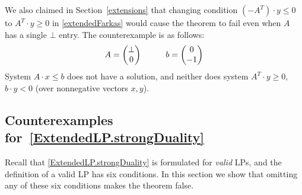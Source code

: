 \documentclass[]{article}
\renewcommand{\.}{\hskip .75pt}
\newcommand{\sekt}[1]{Section~\ref{#1}}
\let\*=\cdot
\begin{document}
We also claimed in \sekt{extensions} that changing condition $(-A^T) \* y \le 0$
to  $A^T \* y \ge 0$ in  \ref{extendedFarkas} would cause the theorem
to fail even when $A$ has a single $\bot$ entry. The counterexample is as follows:
$$
\begin{array}{c@{\hspace{30pt}}c}
A =
\begin{pmatrix}
	\bot  \\
	0 
\end{pmatrix}
&
b = \begin{pmatrix} 0 \\ -1 \end{pmatrix}
\end{array}
$$
System $A \* x\le b$ does not have a solution, and neither does system
$A^T \* y \ge 0$, $b \* y < 0$ (over nonnegative vectors $x,y$).

\subsection{Counterexamples for~\ref{ExtendedLP.strongDuality}}\label{sec:ExtendedLP.strongDuality:counterexamples}
Recall that \ref{ExtendedLP.strongDuality} is formulated for {\em valid} LPs,
and the definition of a valid LP has six conditions.
In this section we show that omitting any of these six conditions
makes the theorem false.
\end{document}
